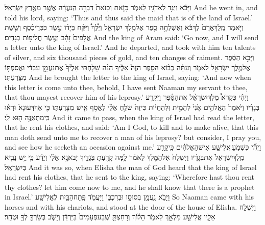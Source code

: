 {וַיָּבֹ֕א וַיַּגֵּ֥ד לַאדֹנָ֖יו לֵאמֹ֑ר כָּזֹ֤את וְכָזֹאת֙ דִּבְּרָ֣ה הַֽנַּעֲרָ֔ה אֲשֶׁ֖ר מֵאֶ֥רֶץ יִשְׂרָאֵֽל׃}
{And he went in, and told his lord, saying: ‘Thus and thus said the maid that is of the land of Israel.’}
{וַיֹּ֤אמֶר מֶֽלֶךְ\maqqaf אֲרָם֙ לֶךְ\maqqaf בֹּ֔א וְאֶשְׁלְחָ֥ה סֵ֖פֶר אֶל\maqqaf מֶ֣לֶךְ יִשְׂרָאֵ֑ל וַיֵּ֩לֶךְ֩ וַיִּקַּ֨ח בְּיָד֜וֹ עֶ֣שֶׂר כִּכְּרֵי\maqqaf כֶ֗סֶף וְשֵׁ֤שֶׁת אֲלָפִים֙ זָהָ֔ב וְעֶ֖שֶׂר חֲלִיפ֥וֹת בְּגָדִֽים׃}
{And the king of Aram said: ‘Go now, and I will send a letter unto the king of Israel.’ And he departed, and took with him ten talents of silver, and six thousand pieces of gold, and ten changes of raiment.}
{וַיָּבֵ֣א הַסֵּ֔פֶר אֶל\maqqaf מֶ֥לֶךְ יִשְׂרָאֵ֖ל לֵאמֹ֑ר וְעַתָּ֗ה כְּב֨וֹא הַסֵּ֤פֶר הַזֶּה֙ אֵלֶ֔יךָ הִנֵּ֨ה שָׁלַ֤חְתִּי אֵלֶ֙יךָ֙ אֶת\maqqaf נַעֲמָ֣ן עַבְדִּ֔י וַאֲסַפְתּ֖וֹ מִצָּרַעְתּֽוֹ׃}
{And he brought the letter to the king of Israel, saying: ‘And now when this letter is come unto thee, behold, I have sent Naaman my servant to thee, that thou mayest recover him of his leprosy.’}
{וַיְהִ֡י כִּקְרֹא֩ מֶלֶךְ\maqqaf יִשְׂרָאֵ֨ל אֶת\maqqaf הַסֵּ֜פֶר וַיִּקְרַ֣ע בְּגָדָ֗יו וַיֹּ֙אמֶר֙ הַאֱלֹהִ֥ים אָ֙נִי֙ לְהָמִ֣ית וּֽלְהַחֲי֔וֹת כִּי\maqqaf זֶה֙ שֹׁלֵ֣חַ אֵלַ֔י לֶאֱסֹ֥ף אִ֖ישׁ מִצָּרַעְתּ֑וֹ כִּ֤י אַךְ\maqqaf דְּעוּ\maqqaf נָא֙ וּרְא֔וּ כִּֽי\maqqaf מִתְאַנֶּ֥ה ה֖וּא לִֽי׃}
{And it came to pass, when the king of Israel had read the letter, that he rent his clothes, and said: ‘Am I God, to kill and to make alive, that this man doth send unto me to recover a man of his leprosy? but consider, I pray you, and see how he seeketh an occasion against me.’}
{וַיְהִ֞י כִּשְׁמֹ֣עַ \legarmeh  אֱלִישָׁ֣ע אִישׁ\maqqaf הָאֱלֹהִ֗ים כִּֽי\maqqaf קָרַ֤ע מֶֽלֶךְ\maqqaf יִשְׂרָאֵל֙ אֶת\maqqaf בְּגָדָ֔יו וַיִּשְׁלַח֙ אֶל\maqqaf הַמֶּ֣לֶךְ לֵאמֹ֔ר לָ֥מָּה קָרַ֖עְתָּ בְּגָדֶ֑יךָ יָבֹא\maqqaf נָ֣א אֵלַ֔י וְיֵדַ֕ע כִּ֛י יֵ֥שׁ נָבִ֖יא בְּיִשְׂרָאֵֽל׃}
{And it was so, when Elisha the man of God heard that the king of Israel had rent his clothes, that he sent to the king, saying: ‘Wherefore hast thou rent thy clothes? let him come now to me, and he shall know that there is a prophet in Israel.’}
{וַיָּבֹ֥א נַֽעֲמָ֖ן בְּסוּסָ֣ו וּבְרִכְבּ֑וֹ וַיַּעֲמֹ֥ד פֶּֽתַח\maqqaf הַבַּ֖יִת לֶאֱלִישָֽׁע׃}
{So Naaman came with his horses and with his chariots, and stood at the door of the house of Elisha.}
{וַיִּשְׁלַ֥ח אֵלָ֛יו אֱלִישָׁ֖ע מַלְאָ֣ךְ לֵאמֹ֑ר הָל֗וֹךְ וְרָחַצְתָּ֤ שֶֽׁבַע\maqqaf פְּעָמִים֙ בַּיַּרְדֵּ֔ן וְיָשֹׁ֧ב בְּשָׂרְךָ֛ לְךָ֖ וּטְהָֽר׃}
